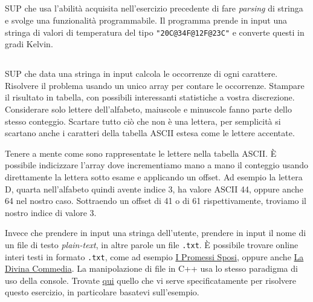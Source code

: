 \documentclass{article}
\begin{document}
\subsection{}
SUP che usa l'abilità acquisita nell'esercizio precedente di fare \textit{parsing} di stringa e svolge una funzionalità programmabile. Il programma prende in input una stringa di valori di temperatura del tipo \texttt{"20C@34F@12F@23C"} e converte questi in gradi Kelvin. 


\subsection{}
SUP che data una stringa in input calcola le occorrenze di ogni carattere. Risolvere il problema usando un unico array per contare le occorrenze. Stampare il risultato in tabella, con possibili interessanti statistiche a vostra discrezione. Considerare solo lettere dell'alfabeto, maiuscole e minuscole fanno parte dello stesso conteggio. Scartare tutto ciò che non è una lettera, per semplicità si scartano anche i caratteri della tabella ASCII estesa come le lettere accentate.
\begin{info}
	Tenere a mente come sono rappresentate le lettere nella tabella ASCII. È possibile indicizzare l'array dove incrementiamo mano a mano il conteggio usando direttamente la lettera sotto esame e applicando un offset. Ad esempio la lettera D, quarta nell'alfabeto quindi avente indice 3, ha valore ASCII 44, oppure anche 64 nel nostro caso. Sottraendo un offset di 41 o di 61 rispettivamente, troviamo il nostro indice di valore 3.
\end{info}
\begin{warn} 
	Invece che prendere in input una stringa dell'utente, prendere in input il nome di un file di testo \textit{plain-text}, in altre parole un file \texttt{.txt}. È possibile trovare online interi testi in formato \texttt{.txt}, come ad esempio \href{http://rosada.yolasite.com/resources/i_promessi%20spo unsi.txt}{I Promessi Sposi}, oppure anche \href{https://www.google.com/url?sa=t&rct=j&q=&esrc=s&source=web&cd=&ved=2ahUKEwjEuuHktontAhWQa8AKHdv_D3AQFjAAegQIBBAC&url=http%3A%2F%2Fwww.hoepliscuola.it%2Fdownload%2F2842%2Fla-divina-commedia-txt.aspx&usg=AOvVaw2-ivHQ7MdppenKh_hOjUeB}{La Divina Commedia}. La manipolazione di file in C++ usa lo stesso paradigma di uso della console. Trovate \href{http://www.cplusplus.com/reference/istream/istream/get/}{qui} quello che vi serve specificatamente per risolvere questo esercizio, in particolare basatevi sull'esempio.
\end{warn}
\end{document}
